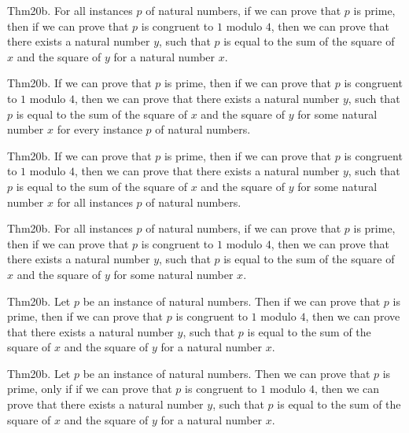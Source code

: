 \documentclass{article}
\begin{document}
Thm20b. For all instances $p$ of natural numbers, if we can prove that $p$ is prime, then if we can prove that $p$ is congruent to $1$ modulo $4$, then we can prove that there exists a natural number $y$, such that $p$ is equal to the sum of the square of $x$ and the square of $y$ for a natural number $x$.

Thm20b. If we can prove that $p$ is prime, then if we can prove that $p$ is congruent to $1$ modulo $4$, then we can prove that there exists a natural number $y$, such that $p$ is equal to the sum of the square of $x$ and the square of $y$ for some natural number $x$ for every instance $p$ of natural numbers.

Thm20b. If we can prove that $p$ is prime, then if we can prove that $p$ is congruent to $1$ modulo $4$, then we can prove that there exists a natural number $y$, such that $p$ is equal to the sum of the square of $x$ and the square of $y$ for some natural number $x$ for all instances $p$ of natural numbers.

Thm20b. For all instances $p$ of natural numbers, if we can prove that $p$ is prime, then if we can prove that $p$ is congruent to $1$ modulo $4$, then we can prove that there exists a natural number $y$, such that $p$ is equal to the sum of the square of $x$ and the square of $y$ for some natural number $x$.

Thm20b. Let $p$ be an instance of natural numbers. Then if we can prove that $p$ is prime, then if we can prove that $p$ is congruent to $1$ modulo $4$, then we can prove that there exists a natural number $y$, such that $p$ is equal to the sum of the square of $x$ and the square of $y$ for a natural number $x$.

Thm20b. Let $p$ be an instance of natural numbers. Then we can prove that $p$ is prime, only if if we can prove that $p$ is congruent to $1$ modulo $4$, then we can prove that there exists a natural number $y$, such that $p$ is equal to the sum of the square of $x$ and the square of $y$ for a natural number $x$.
\end{document}
